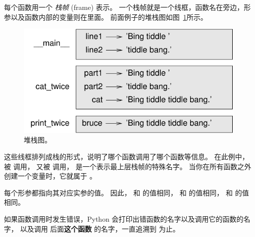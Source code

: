 每个函数用一个 {\em 栈帧} (frame) 表示。
一个栈帧就是一个线框，函数名在旁边，形参以及函数内部的变量则在里面。
前面例子的堆栈图如图~\ref{fig.stack}所示。

\begin{figure}
\centerline
{\includegraphics[scale=0.8]{../source/figs/stack.pdf}}
\caption{堆栈图。}
\label{fig.stack}
\end{figure}


这些线框排列成栈的形式，说明了哪个函数调用了哪个函数等信息。
在此例中， 被  调用，
 又被  调用，  是一个表示最上层栈帧的特殊名字。
当你在所有函数之外创建一个变量时，它就属于 。


每个形参都指向其对应实参的值。
因此， 和  的值相同，  和  的值相同，  和  的值相同。


如果函数调用时发生错误，Python 会打印出错函数的名字以及调用它的函数的名字，
以及调用 后面{\bf 这个函数} 的名字，一直追溯到  为止。


